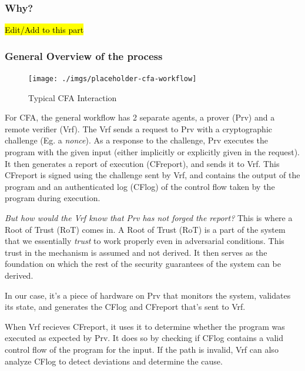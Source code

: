 \documentclass[a4paper, nobind]{templates/ociamthesis}
\begin{document}
\subsubsection{Why?}\label{why}

\hl{Edit/Add to this part}

\subsubsection{General Overview of the process}\label{general-overview-of-the-process}

\begin{figure}[H]

{\centering \texttt{[image: ./imgs/placeholder-cfa-workflow]} 

}

\caption{Typical CFA Interaction}\label{fig:cfa-workflow}
\end{figure}

For CFA, the general workflow has 2 separate agents, a prover (Prv) and a remote verifier (Vrf).
The Vrf sends a request to Prv with a cryptographic challenge (Eg. a \emph{nonce}).
As a response to the challenge, Prv executes the program with the given
input (either implicitly or explicitly given in the request).
It then generates a report of execution (CFreport), and sends it to Vrf.
This CFreport is signed using the challenge sent by Vrf, and contains the output of the program and an
authenticated log (CFlog) of the control flow taken by the program during execution.

\emph{But how would the Vrf know that Prv has not forged the report?}
This is where a Root of Trust (RoT) comes in.
A Root of Trust (RoT) is a part of the system that we essentially \emph{trust} to work
properly even in adversarial conditions. This trust in the mechanism is assumed and not derived.
It then serves as the foundation on which the rest of the security guarantees
of the system can be derived.

In our case, it's a piece of hardware on Prv that monitors the system, validates its state,
and generates the CFlog and CFreport that's sent to Vrf.

When Vrf recieves CFreport, it uses it to determine whether the program was executed as expected by Prv.
It does so by checking if CFlog contains a valid control flow of the program
for the input. If the path is invalid, Vrf can also analyze CFlog to detect
deviations and determine the cause.
\end{document}
